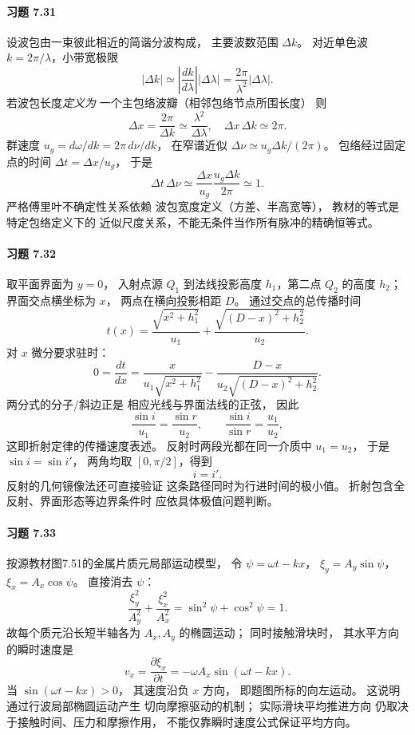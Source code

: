 \paragraph{习题 7.31}
设波包由一束彼此相近的简谐分波构成，
主要波数范围
\(\Delta k\)。
对近单色波
\(k=2\pi/\lambda\)，小带宽极限
\[
 |\Delta k|\simeq
 \left|\frac{dk}{d\lambda}\right|
 |\Delta\lambda|
 =\frac{2\pi}{\lambda^2}|\Delta\lambda|.
\]
若波包长度\emph{定义为}
一个主包络波瓣（相邻包络节点所围长度）
则
\[
 \boxed{\Delta x=\frac{2\pi}{\Delta k}
 \simeq\frac{\lambda^2}{\Delta\lambda}},
\quad
 \boxed{\Delta x\,\Delta k\simeq2\pi}.
\]
群速度
\(u_g=d\omega/dk=2\pi\,d\nu/dk\)，
在窄谱近似
\(\Delta\nu\simeq u_g\Delta k/(2\pi)\)。
包络经过固定点的时间
\(\Delta t=\Delta x/u_g\)，
于是
\[
 \boxed{\Delta t\,\Delta\nu\simeq
 \frac{\Delta x}{u_g}
 \frac{u_g\Delta k}{2\pi}\simeq1}.
\]
严格傅里叶不确定性关系依赖
波包宽度定义（方差、半高宽等），
教材的等式是特定包络定义下的
近似尺度关系，不能无条件当作所有脉冲的精确恒等式。

\paragraph{习题 7.32}
取平面界面为 \(y=0\)，
入射点源 \(Q_1\) 到法线投影高度
\(h_1\)，第二点 \(Q_2\) 的高度
\(h_2\)；界面交点横坐标为 \(x\)，
两点在横向投影相距 \(D\)。
通过交点的总传播时间
\[
 t(x)=\frac{\sqrt{x^2+h_1^2}}{u_1}
 +\frac{\sqrt{(D-x)^2+h_2^2}}{u_2}.
\]
对 \(x\) 微分要求驻时：
\[
 0=\frac{dt}{dx}
 =\frac{x}{u_1\sqrt{x^2+h_1^2}}
 -\frac{D-x}{u_2\sqrt{(D-x)^2+h_2^2}}.
\]
两分式的分子/斜边正是
相应光线与界面法线的正弦，
因此
\[
 \boxed{\frac{\sin i}{u_1}
 =\frac{\sin r}{u_2}},\qquad
 \boxed{\frac{\sin i}{\sin r}
 =\frac{u_1}{u_2}},
\]
这即折射定律的传播速度表述。
反射时两段光都在同一介质中
\(u_1=u_2\)，
于是
\(\sin i=\sin i'\)，
两角均取 \([0,\pi/2]\)，得到
\[
 \boxed{i=i'}.
\]
反射的几何镜像法还可直接验证
这条路径同时为行进时间的极小值。
折射包含全反射、界面形态等边界条件时
应依具体极值问题判断。

\paragraph{习题 7.33}
按源教材图7.51的金属片质元局部运动模型，
令
\(\psi=\omega t-kx\)，
\(\xi_y=A_y\sin\psi\)，
\(\xi_x=A_x\cos\psi\)。
直接消去 \(\psi\)：
\[
 \frac{\xi_y^2}{A_y^2}+
 \frac{\xi_x^2}{A_x^2}
 =\sin^2\psi+\cos^2\psi
 =\boxed{1}.
\]
故每个质元沿长短半轴各为
\(A_x,A_y\) 的椭圆运动；
同时接触滑块时，
其水平方向的瞬时速度是
\[
 \boxed{v_x=\frac{\partial\xi_x}{\partial t}
 =-\omega A_x\sin(\omega t-kx)}.
\]
当 \(\sin(\omega t-kx)>0\)，
其速度沿负 \(x\) 方向，
即题图所标的向左运动。
这说明通过行波局部椭圆运动产生
切向摩擦驱动的机制；
实际滑块平均推进方向
仍取决于接触时间、压力和摩擦作用，
不能仅靠瞬时速度公式保证平均方向。
